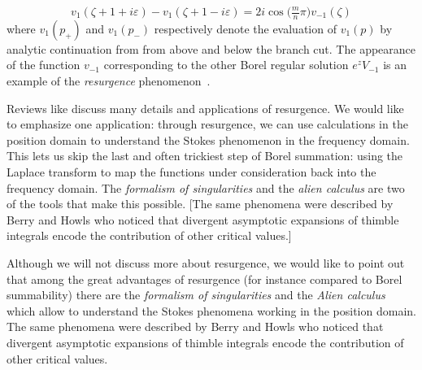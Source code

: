 \documentclass{article}
\theoremstyle{definition}
\theoremstyle{plain}
\newenvironment{todo}{\color{Coral}}{\color{black}}
\newenvironment{old}{\color{RoyalBlue}}{\color{black}}
\newenvironment{draft}{\color{SlateBlue}}{\color{black}}
\newenvironment{revised}{\color{DarkBlue}}{\color{black}}
\begin{document}
\begin{revised}
\begin{draft}
\begin{equation}
\end{equation}
\end{draft}
\begin{old}
\begin{equation}\label{resurgent-relation-1}
    v_1(\zeta+1+i\varepsilon)-v_1(\zeta+1-i\varepsilon)=2i \cos\big(\tfrac{m}{n}\pi\big) v_{-1}(\zeta)
\end{equation}
\end{old}
where $v_1(p_+)$ and $v_1(p_-)$ respectively denote the evaluation of $v_1(p)$ by analytic continuation from from above and below the branch cut. The appearance of the function $v_{-1}$ corresponding to the other Borel regular solution $e^z V_{-1}$ is an example of the {\em resurgence} phenomenon~\cite{EcalleI,EcalleII,EcalleIII}.

Reviews like \cite{diverg-resurg-i,Dorigoni,aniceto2019primer} discuss many details and applications of resurgence. We would like to emphasize one application: through resurgence, we can use calculations in the position domain to understand the Stokes phenomenon in the frequency domain. This lets us skip the last and often trickiest step of Borel summation: using the Laplace transform to map the functions under consideration back into the frequency domain. The {\em formalism of singularities} and the {\em alien calculus} are two of the tools that make this possible. \begin{todo}[The same phenomena were described by Berry and Howls \cite{Berry_Howls} who noticed that divergent asymptotic expansions of thimble integrals encode the contribution of other critical values.]\end{todo}
\end{revised}
\begin{old}\par
Although we will not discuss more about resurgence, we would like to point out that among the great advantages of resurgence (for instance compared to Borel summability) there are the \textit{formalism of singularities} and the \textit{Alien calculus} which allow to understand the Stokes phenomena working in the position domain. The same phenomena were described by Berry and Howls \cite{Berry_Howls} who noticed that divergent asymptotic expansions of thimble integrals encode the contribution of other critical values.
\end{old}
\end{document}
